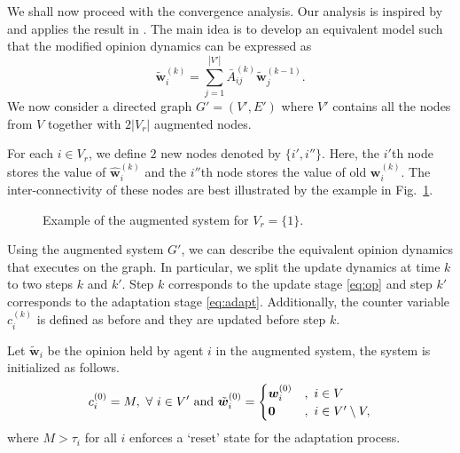 \documentclass[letter]{article}
\theoremstyle{remark}
\begin{document}
We shall now proceed with the convergence analysis. 
Our analysis is inspired by \cite{Nedic2010} and applies the result in \cite{Touri2014}. The main idea is to develop an equivalent model such that the modified opinion dynamics can be expressed as
\[
\tilde{\bm w}_i^{(k)} = \sum_{j=1}^{|V'|} \bar{A}_{ij}^{(k)} \tilde{\bm w}_j^{(k-1)}.
\]
We now consider a directed graph $G' = (V',E')$ where $V'$ contains all the nodes from $V$ together with $2|V_r|$ augmented nodes. 

For each $i \in V_r$, we define $2$ new nodes denoted by $\{ i', i'' \}$. Here, the $i'$th node stores the value of $\hat{\bm w}_i^{(k)}$ and the $i''$th node stores the value of old ${\bm w}_i^{(k)}$. The inter-connectivity of these nodes are best illustrated by the example in Fig.~\ref{fig:augment}. 

\begin{figure}[t]
\centerline{
}
\caption{Example of the augmented system for $V_r = \{1\}$. 
} \label{fig:augment}
\end{figure}

Using the augmented system $G'$, we can describe the equivalent opinion dynamics that executes on the graph. In particular, we split the update dynamics at time $k$ to two steps $k$ and $k'$. Step $k$ corresponds to the update stage \eqref{eq:op} and step $k'$ corresponds to the adaptation stage \eqref{eq:adapt}. 
Additionally, the counter variable $c_i^{(k)}$ is defined as before and they are updated before step $k$. 

Let $\tilde{ \bm w}_i$ be the opinion held by agent $i$ in the augmented system, the system is initialized as follows.
\[
c_i^{(0)} = M,~\forall~ i \in V'~{\rm and}~\tilde{ \bm w}_i^{(0)} = \begin{cases} { \bm w}_i^{(0)} &,~i \in V \\
 {\bf 0} &,~i \in V' \setminus V, \end{cases}
\]
where $M > \tau_i$ for all $i$ enforces a `reset' state for the adaptation process. 
\end{document}
